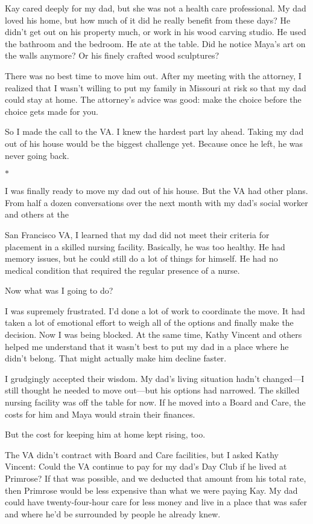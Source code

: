 \documentclass[12pt]{book}
\begin{document}
Kay cared deeply for my dad, but she was not a health care professional. My dad loved his home, but how much of it did he really benefit from these days? He didn't get out on his property much, or work in his wood carving studio. He used the bathroom and the bedroom. He ate at the table. Did he notice Maya's art on the walls anymore? Or his finely crafted wood sculptures?

There was no best time to move him out. After my meeting with the attorney, I realized that I wasn't willing to put my family in Missouri at risk so that my dad could stay at home. The attorney's advice was good: make the choice before the choice gets made for you.

So I made the call to the VA. I knew the hardest part lay ahead. Taking my dad out of his house would be the biggest challenge yet. Because once he left, he was never going back.

\begin{center}$*$\end{center}

I was finally ready to move my dad out of his house. But the VA had other plans. From half a dozen conversations over the next month with my dad's social worker and others at the

San Francisco VA, I learned that my dad did not meet their criteria for placement in a skilled nursing facility. Basically, he was too healthy. He had memory issues, but he could still do a lot of things for himself. He had no medical condition that required the regular presence of a nurse.

Now what was I going to do?

I was supremely frustrated. I'd done a lot of work to coordinate the move. It had taken a lot of emotional effort to weigh all of the options and finally make the decision. Now I was being blocked. At the same time, Kathy Vincent and others helped me understand that it wasn't best to put my dad in a place where he didn't belong. That might actually make him decline faster.

I grudgingly accepted their wisdom. My dad's living situation hadn't changed---I still thought he needed to move out---but his options had narrowed. The skilled nursing facility was off the table for now. If he moved into a Board and Care, the costs for him and Maya would strain their finances.

But the cost for keeping him at home kept rising, too.

The VA didn't contract with Board and Care facilities, but I asked Kathy Vincent: Could the VA continue to pay for my dad's Day Club if he lived at Primrose? If that was possible, and we deducted that amount from his total rate, then Primrose would be less expensive than what we were paying Kay. My dad could have twenty-four-hour care for less money and live in a place that was safer and where he'd be surrounded by people he already knew.
\end{document}

